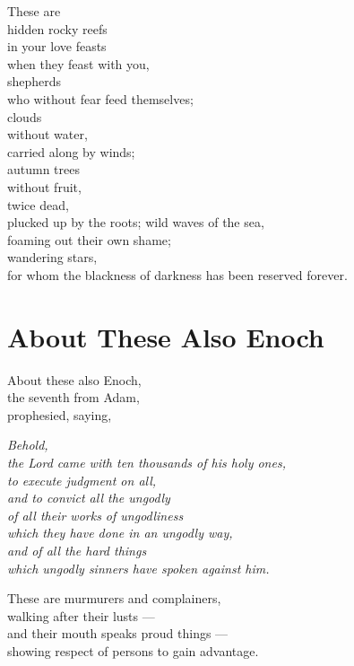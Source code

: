 \documentclass[twoside, openany, 12pt]{extbook}
\newcommand{\tab}[1][0.5cm]{\hspace*{#1}}
\begin{document}
These are
\\
\tab{}
hidden rocky reefs
\\
\tab{}
\tab{}
in your love feasts
\\
\tab{}
\tab{}
\tab{}
when they feast with you,
\\
\tab{}
shepherds
\\
\tab{}
\tab{}
who without fear feed themselves;
\\
\tab{}
clouds
\\
\tab{}
\tab{}
without water,
\\
\tab{}
\tab{}
carried along by winds;
\\
\tab{}
autumn trees
\\
\tab{}
\tab{}
without fruit,
\\
\tab{}
\tab{}
twice dead,
\\
\tab{}
\tab{}
\tab{}
plucked up by the roots;
wild waves of the sea,
\\
\tab{}
\tab{}
foaming out their own shame;
\\
\tab{}
wandering stars,
\\
\tab{}
\tab{}
for whom the blackness of darkness
has been reserved forever.

\newpage\section{About These Also Enoch}

About these also Enoch,
\\
\tab{}
the seventh from Adam,
\\
prophesied,
saying,

{\itshape{}
  \tab{}
  Behold,
  \\
  \tab{}
  the Lord came with ten thousands of his holy ones,
  \\
  \tab{}
  to execute judgment on all,
  \\
  \tab{}
  and to convict all the ungodly
  \\
  \tab{}
  \tab{}
  of all their works of ungodliness
  \\
  \tab{}
  \tab{}
  \tab{}
  which they have done in an ungodly way,
  \\
  \tab{}
  and of all the hard things
  \\
  \tab{}
  \tab{}
  which ungodly sinners have spoken against him.
}

These are murmurers and complainers,
\\
walking after their lusts ---
\\
\tab{}
and their mouth speaks proud things ---
\\
\tab{}
\tab{}
showing respect of persons to gain advantage.
\end{document}
